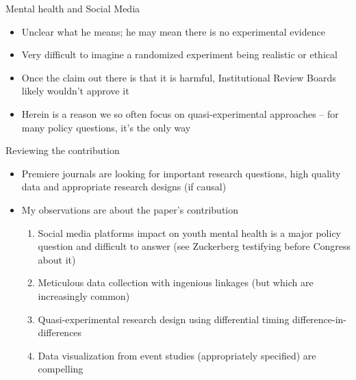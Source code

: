 \documentclass{beamer}
\begin{document}
\begin{frame}{Mental health and Social Media}

\begin{itemize}
\item Unclear what he means; he may mean there is no experimental evidence
\item Very difficult to imagine a randomized experiment being realistic or ethical 
\item Once the claim out there is that it is harmful, Institutional Review Boards likely wouldn't approve it
\item Herein is a reason we so often focus on quasi-experimental approaches -- for many policy questions, it's the only way 


\end{itemize}

\end{frame}

\begin{frame}{Reviewing the contribution}

\begin{itemize}

\item Premiere journals are looking for important research questions, high quality data and appropriate research designs (if causal)
\item My observations are about the paper's contribution
	\begin{enumerate}
	\item Social media platforms impact on youth mental health is a major policy question and difficult to answer (see Zuckerberg testifying before Congress about it)
	\item Meticulous data collection with ingenious linkages (but which are increasingly common)
	\item Quasi-experimental research design using differential timing difference-in-differences
	\item Data visualization from event studies (appropriately specified) are compelling
	\end{enumerate}

\end{itemize}

\end{frame}
\end{document}
